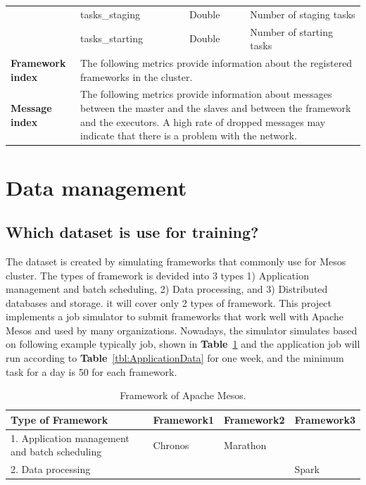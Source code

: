 \documentclass[12pt,oneside,openright,a4paper]{cpe-english-project}
\begin{document}
\begin{table}[!h]
\begin{tabular}{|p{}|p{}|p{}|p{}|}
    \cline{2-4} & tasks\_staging & Double & Number of staging tasks \\ 
    \cline{2-4} & tasks\_starting & Double & Number of starting tasks \\ 
    \hline
    \textbf{Framework index} & \multicolumn{3}{p{0.7\textwidth}|}{ The following metrics provide information about the registered frameworks in the cluster.} \\ 
    \hline
    \textbf{Message index} & \multicolumn{3}{p{0.7\textwidth}|}{ The following metrics provide information about messages between the master and the slaves and between the framework and the executors. A high rate of dropped messages may indicate that there is a problem with the network.} \\ 
    \hline
  \end{tabular}
\end{table}

\newpage

\section{Data management}

\subsection{Which dataset is use for training?}
\hspace{10mm}The dataset is created by simulating frameworks that commonly use for Mesos cluster. The types of framework is devided into 3 types 1) Application management and batch scheduling, 2) Data processing, and 3) Distributed databases and storage. it will cover only 2 types of framework. This project implements a job simulator to submit frameworks that work well with Apache Mesos and used by many organizations. Nowadays, the simulator simulates based on following example typically job, shown in \textbf{Table}~\ref{tbl:MesosFramework} and the application job will run according to \textbf{Table}~\ref{tbl:ApplicationData} for one week, and the minimum task for a day is 50 for each framework.

\begin{table}[!h]
  \caption{Framework of Apache Mesos.}\label{tbl:MesosFramework}
    \begin{tabular}{@{}|p{}|p{}|p{}|p{}|}
    \hline
    \textbf{Type of Framework} & \textbf{Framework1} & \textbf{Framework2} & \textbf{Framework3}\\
    \hline
    1. Application management and batch scheduling & Chronos & Marathon & \\
    \hline
    2. Data processing &  & & Spark\\
    \hline
  \end{tabular}
\end{table}
\end{document}
